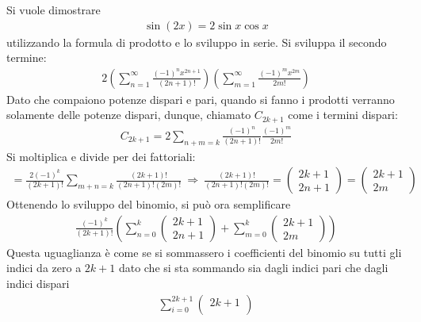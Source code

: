 \documentclass[a4paper, oneside]{article}
\begin{document}
\begin{example} 
    Si vuole dimostrare
    \begin{gather*}
        \sin(2x) = 2\sin x \cos x
    \end{gather*}
    utilizzando la formula di prodotto e lo sviluppo in serie. Si 
    sviluppa il secondo termine:
    \begin{gather*}
        2\left(\sum_{n = 1}^{\infty } \frac{(-1)^{n} x^{2n + 1}}{(2n + 1)!} \right) \left(\sum_{m = 1}^{\infty } \frac{(-1)^{m}x^{2m}}{2m!} \right)
    \end{gather*}
    Dato che compaiono potenze dispari e pari, quando si fanno i prodotti verranno solamente 
    delle potenze dispari, dunque, chiamato $C_{2k + 1}$ come i termini dispari:
    \begin{gather*}
        C_{2k + 1} = 2\sum_{n + m = k}^{} \frac{(-1)^{n}}{(2n + 1) !} \frac{(-1)^{m}}{2m!} 
    \end{gather*}
    Si moltiplica e divide per dei fattoriali:
    \begin{gather*}
        = \frac{2(-1)^{k}}{(2k + 1) !} \sum_{m + n = k} \frac{(2k + 1)!}{(2n + 1)!(2m)!} \ \Longrightarrow \ \frac{(2k + 1)!}{(2n + 1)! (2m)!} = \begin{pmatrix} 2k + 1 \\
        2n + 1 \end{pmatrix} =  \begin{pmatrix} 2k + 1  \\
        2m\end{pmatrix} 
    \end{gather*}
    Ottenendo lo sviluppo del binomio, si può ora semplificare
    \begin{gather*}
        \frac{(-1)^{k}}{(2k + 1)!} \left(\sum_{n = 0}^{k} \begin{pmatrix} 2k + 1 \\
        2n + 1 \end{pmatrix} + \sum_{m = 0}^{k} \begin{pmatrix} 2k + 1\\
        2m \end{pmatrix}  \right)
    \end{gather*}
    Questa uguaglianza è come se si sommassero i coefficienti del binomio su tutti gli indici da
    zero a $2k + 1$ dato che si sta sommando sia dagli indici pari che dagli indici dispari
    \begin{gather*}
        \sum_{i = 0}^{2k + 1} \begin{pmatrix} 2k + 1 \\

\end{pmatrix}
\end{gather*}
\end{example}
\end{document}
